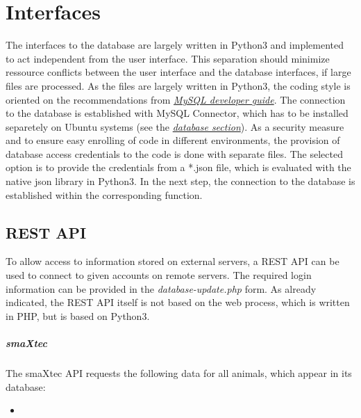 
\chapter{Interfaces}
The interfaces to the database are largely written in Python3 and implemented to act independent from the user interface. This separation should minimize ressource conflicts between the user 
interface and the database interfaces, if large files are processed. As the files are largely written in Python3, the coding style is oriented on the recommendations from 
\href{https://dev.mysql.com/doc/connector-python/en/}{\textit{MySQL developer guide}}. The connection to the database is established with MySQL Connector, which has to be installed separetely on Ubuntu 
systems (see the \hyperref[Database installation and configuration]{\textit{database section}}). 
As a security measure and to ensure easy enrolling of code in different environments, the provision of database access credentials to the code is done with separate files. The selected option is to 
provide the credentials from a *.json file, which is evaluated with the native json library in Python3. In the next step, the connection to the database is established within the corresponding 
function.\\

\section{REST API}
To allow access to information stored on external servers, a REST API can be used to connect to given accounts on remote servers. The required login information can be provided in the \emph{database-update.php} form. As already indicated, the REST API itself is not based on the web process, which is written in PHP, but is based on Python3.\\
\paragraph{smaXtec}
The smaXtec API requests the following data for all animals, which appear in its database:
\begin{itemize}
	\item 
\end{itemize}